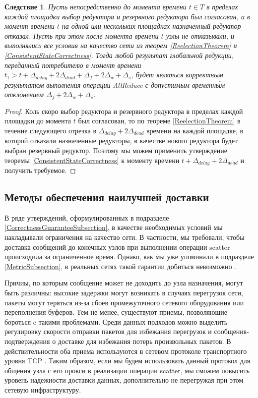 \documentclass{article}
\theoremstyle{plain}
\theoremstyle{plain}
\newtheorem{consequence}[theorem]{Следствие}
\theoremstyle{plain}
\theoremstyle{plain}
\theoremstyle{definition}
\theoremstyle{remark}
\theoremstyle{plain}
\begin{document}
\begin{consequence}
    Пусть непосредственно до момента времени $t \in T$ в пределах каждой площадки выбор редуктора и резервного редуктора был согласован, а в момент времени $t$ на одной или нескольких площадках назначенный редуктор отказал. Пусть при этом после момента времени $t$ узлы не отказывали, и выполнялись все условия на качество сети из теорем \ref{ReelectionTheorem} и \ref{ConsistentStateCorrectness}. Тогда любой результат глобальной редукции, переданный потребителю в момент времени $t_1 > t + \Delta_{delay} + 2\Delta_{dead} + \Delta_f + 2\Delta_w + \Delta_s$, будет являться корректным результатом выполнения операции AllReduce с допустимым временн\'{ы}м отклонением $\Delta_f + 2\Delta_w + \Delta_s$.
\end{consequence}
\begin{proof}
    Коль скоро выбор редуктора и резервного редуктора в пределах каждой площадки до момента $t$ был согласован, то по теореме \ref{ReelectionTheorem} в течение следующего отрезка в $\Delta_{delay} + 2\Delta_{dead}$ времени на каждой площадке, в которой отказали назначенные редукторы, в качестве нового редуктора будет выбран резервный редуктор. Поэтому мы можем применить утверждение теоремы \ref{ConsistentStateCorrectness} к моменту времени $t + \Delta_{delay} + 2\Delta_{dead}$ и получить требуемое.
\end{proof}

\subsection{Методы обеспечения наилучшей доставки}
\label{BestEffortDeliverySubsection}

В ряде утверждений, сформулированных в подразделе \ref{CorrectnessGuaranteeSubsection}, в качестве необходимых условий мы накладывали ограничения на качество сети. В частности, мы требовали, чтобы доставка сообщений до конечных узлов при выполнении операции scatter происходила за ограниченное время. Однако, как мы уже упоминали в подразделе \ref{MetricSubsection}, в реальных сетях такой гарантии добиться невозможно \cite{networking:best-effort-service}.

Причиы, по которым сообщение может не доходить до узла назначения, могут быть различны: высокие задержки могут возникать в случаях перегрузок сети, пакеты могут теряться из-за сбоев промежуточного сетевого оборудования или переполнения буферов. Тем не менее, существуют приемы, позволяющие бороться c такими проблемами. Среди данных подходов можно выделить регулировку скорости отправки пакетов для избежания перегрузок и сообщения-подтверждения о доставке для избежания потерь произвольных пакетов. В действительности оба приема используются в сетевом протоколе транспортного уровня TCP \cite{RFC0793, RFC5681}. Таким образом, если мы будем использовать данный протокол для общения узла с его прокси в реализации операции scatter, мы сможем повысить уровень надежности доставки данных, дополнительно не перегружая при этом сетевую инфраструктуру.
\end{document}
